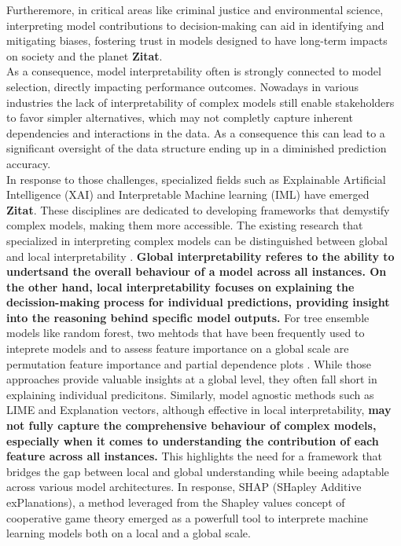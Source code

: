 \documentclass[12pt]{article}
\begin{document}
Furtheremore, in critical areas like criminal justice and environmental science, interpreting model contributions to decision-making can aid in identifying and mitigating biases, fostering trust in models designed to have long-term impacts on society and the planet  \textbf{Zitat}.\\
As a consequence, model interpretability often is strongly connected to model selection, directly impacting performance outcomes.
Nowadays in various industries the lack of interpretability of complex models still enable stakeholders to favor simpler alternatives, which may not completly capture inherent dependencies and interactions in the data.
As a consequence this can lead to a significant oversight of the data structure ending up in a diminished prediction accuracy. \\
In response to those challenges, specialized fields such as Explainable Artificial Intelligence (XAI) and Interpretable Machine learning (IML) have emerged \textbf{Zitat}.
These disciplines are dedicated to developing frameworks that demystify complex models, making them more accessible. 
The existing research that specialized in interpreting complex models can be distinguished between global and local interpretability \cite{molnar2022}. \textbf{Global interpretability referes to the ability to undertsand the overall behaviour of a model across all instances. On the other hand, local interpretability focuses on explaining the decission-making process for individual predictions, providing insight into the reasoning behind specific model outputs.}
For tree ensemble models like random forest, two mehtods that have been frequently used to inteprete models  and to assess feature importance on a global scale are permutation feature importance \cite{article} and partial dependence plots \cite{4a848dd1-54e3-3c3c-83c3-04977ded2e71}. 
While those approaches provide valuable insights at a global level, they often fall short in explaining individual predicitons.
Similarly, model agnostic methods such as LIME \cite{10.1145/2939672.2939778} and Explanation vectors, although effective in local interpretability, \textbf{may not fully capture the comprehensive behaviour of complex models, especially when it comes to understanding the contribution of each feature across all instances.}
This highlights the need for a framework that bridges the gap between local and global understanding while beeing adaptable across various model architectures. 
In response, SHAP (SHapley Additive exPlanations), a method leveraged from the Shapley values concept of cooperative game theory emerged as a powerfull tool to interprete machine learning models both on a local and a global scale. 
\end{document}
